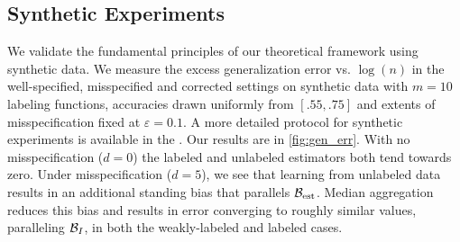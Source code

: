 

\subsection{Synthetic Experiments}

We validate the fundamental principles of our theoretical framework using synthetic data. We measure the excess generalization error vs. $\log(n)$ in the well-specified, misspecified and corrected settings on synthetic data with $m=10$ labeling functions, accuracies drawn uniformly from $[.55, .75]$ and extents of misspecification fixed at $\varepsilon=0.1$. A more detailed protocol for synthetic experiments is available in the .
Our results are in \autoref{fig:gen_err}. With no misspecification ($d=0$) the labeled and unlabeled estimators both tend towards zero. Under misspecification ($d=5$), we see that learning from unlabeled data results in an additional standing bias that parallels $\mathcal{B}_{\mathrm{est}}$. Median aggregation reduces this bias and results in error converging to roughly similar values, paralleling $\mathcal{B}_I$, in both the weakly-labeled and labeled cases.

